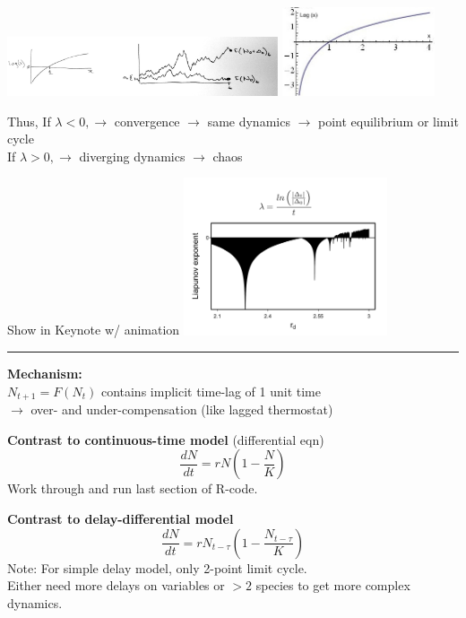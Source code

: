 \documentclass{article}
\newcommand{\note}[1]{\colorbox{gray!30}{#1}}
\newcommand{\ind}{\-\hspace{1cm}}
\begin{document}
\begin{center}
\includegraphics[width=8cm]{figs/Lyapunov.pdf}
\includegraphics[width=4.5cm]{figs/log.jpg}
\end{center}

Thus,
\ind If $\lambda < 0,  \to $ convergence $\to$ same dynamics $\to$ point equilibrium or limit cycle\\
\ind \ind If $\lambda > 0,  \to $ diverging dynamics $\to$ chaos

\begin{center}
\note{Show in Keynote w/ animation}
\includegraphics[width=6cm]{figs/Lyapunov2.pdf}
\end{center}

\rule[0.5ex]{\linewidth}{1pt}
\pagebreak

\textbf{Mechanism:}\\
$N_{t+1} = F(N_t)$ contains implicit time-lag of 1 unit time\\
\ind $\to$ over- and under-compensation (like lagged thermostat)

\textbf{Contrast to continuous-time model} (differential eqn)\\
\begin{equation*}
	\frac{dN}{dt}=rN\left(1-\frac{N}{K}\right)
\end{equation*}
\note{Work through and run last section of R-code.}

\textbf{Contrast to delay-differential model}
\begin{equation*}
	\frac{dN}{dt}=rN_{t-\tau}\left(1-\frac{N_{t-\tau}}{K}\right)
\end{equation*}
Note: For simple delay model, only 2-point limit cycle.  \\
\ind  Either need more delays on variables or $>2$ species to get more complex dynamics.
\end{document}
